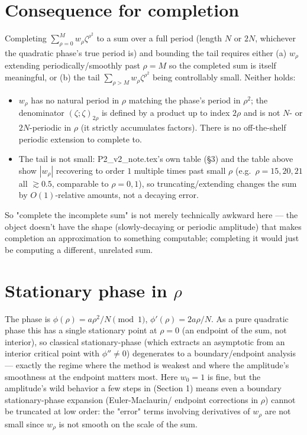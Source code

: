 \documentclass[11pt]{article}
\begin{document}
\section{Consequence for completion}
Completing $\sum_{\rho=0}^M w_\rho\zeta^{\rho^2}$ to a sum over a full period (length $N$ or $2N$,
whichever the quadratic phase's true period is) and bounding the tail requires either (a) $w_\rho$
extending periodically/smoothly past $\rho=M$ so the completed sum is itself meaningful, or (b) the
tail $\sum_{\rho>M} w_\rho\zeta^{\rho^2}$ being controllably small. Neither holds:
\begin{itemize}
\item[(a)] $w_\rho$ has no natural period in $\rho$ matching the phase's period in $\rho^2$; the
denominator $(\zeta;\zeta)_{2\rho}$ is defined by a product up to index $2\rho$ and is not $N$- or
$2N$-periodic in $\rho$ (it strictly accumulates factors). There is no off-the-shelf periodic
extension to complete to.
\item[(b)] The tail is not small: P2\_v2\_note.tex's own table (\S3) and the table above show
$|w_\rho|$ recovering to order $1$ multiple times past small $\rho$ (e.g.\ $\rho=15,20,21$ all
$\gtrsim0.5$, comparable to $\rho=0,1$), so truncating/extending changes the sum by $O(1)$-relative
amounts, not a decaying error.
\end{itemize}
So "complete the incomplete sum" is not merely technically awkward here — the object doesn't have
the shape (slowly-decaying or periodic amplitude) that makes completion an approximation to something
computable; completing it would just be computing a different, unrelated sum.

\section{Stationary phase in $\rho$}
The phase is $\phi(\rho)=a\rho^2/N \pmod 1$, $\phi'(\rho)=2a\rho/N$. As a pure quadratic phase this has
a single stationary point at $\rho=0$ (an endpoint of the sum, not interior), so classical
stationary-phase (which extracts an asymptotic from an interior critical point with $\phi''\neq0$)
degenerates to a boundary/endpoint analysis — exactly the regime where the method is weakest and where
the amplitude's smoothness at the endpoint matters most. Here $w_0=1$ is fine, but the amplitude's wild
behavior a few steps in (Section 1) means even a boundary stationary-phase expansion (Euler-Maclaurin/
endpoint corrections in $\rho$) cannot be truncated at low order: the "error" terms involving
derivatives of $w_\rho$ are not small since $w_\rho$ is not smooth on the scale of the sum.
\end{document}
